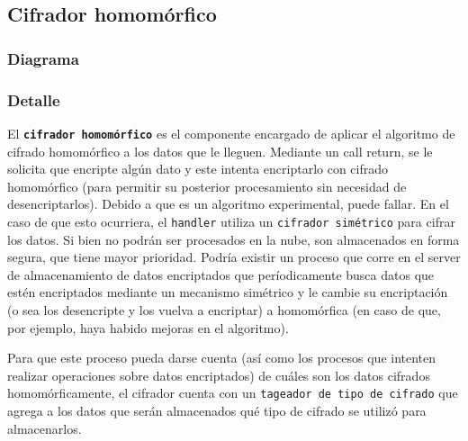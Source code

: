 \subsection{Cifrador homomórfico}\label{cifradorHomo}
\subsubsection{Diagrama}


\subsubsection{Detalle}
El \texttt{\textbf{cifrador homomórfico}} es el componente encargado de aplicar el algoritmo de cifrado homomórfico a los datos que le lleguen. Mediante un call return, se le solicita que encripte algún dato y este intenta encriptarlo con cifrado homomórfico (para permitir su posterior procesamiento sin necesidad de desencriptarlos). Debido a que es un algoritmo experimental, puede fallar. En el caso de que esto ocurriera, el \texttt{handler} utiliza un \texttt{cifrador simétrico} para cifrar los datos. Si bien no podrán ser procesados en la nube, son almacenados en forma segura, que tiene mayor prioridad. Podría existir un proceso que corre en el server de almacenamiento de datos encriptados que períodicamente busca datos que estén encriptados mediante un mecanismo simétrico y le cambie su encriptación (o sea los desencripte y los vuelva a encriptar) a homomórfica (en caso de que, por ejemplo, haya habido mejoras en el algoritmo).

Para que este proceso pueda darse cuenta (así como los procesos que intenten realizar operaciones sobre datos encriptados) de cuáles son los datos cifrados homomórficamente, el cifrador cuenta con un \texttt{tageador de tipo de cifrado} que agrega a los datos que serán almacenados qué tipo de cifrado se utilizó para almacenarlos.

